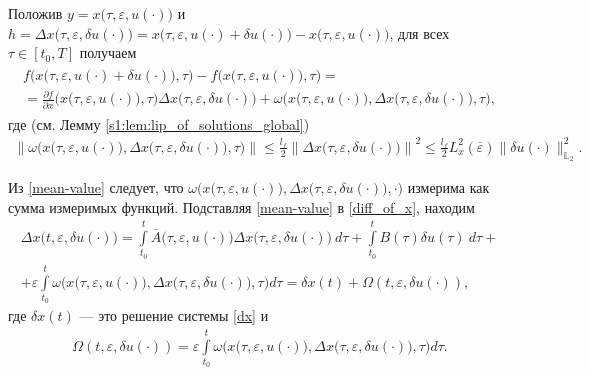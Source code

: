 \documentclass[../main.tex]{subfiles}
\begin{document}
Положив $y = x\big(\tau,\varepsilon, u(\cdot)\big)$ и $h = \Delta x\big(\tau, \varepsilon, \delta u(\cdot)\big) = x\big(\tau,\varepsilon, u(\cdot) + \delta u(\cdot)\big) - x\big(\tau,\varepsilon, u(\cdot)\big)$, для всех $\tau \in [t_0,T]$ получаем
\begin{gather}\label{mean-value}
 \begin{gathered}
 f\Big(x\big(\tau,\varepsilon, u(\cdot) + \delta u(\cdot)\big),\tau\Big) -
 f\Big(x\big(\tau,\varepsilon, u(\cdot)\big),\tau\Big) = \\ = 
 \frac{\partial f}{\partial x} \Big(x\big(\tau,\varepsilon, u(\cdot)\big), \tau\Big) 
 \Delta x\big(\tau, \varepsilon, \delta u(\cdot)\big) + 
 \omega\Big(x\big(\tau,\varepsilon, u(\cdot)\big),\Delta x\big(\tau, \varepsilon, \delta u(\cdot)\big),\tau\Big),
 \end{gathered}
\end{gather}
где (см. Лемму \ref{s1:lem:lip_of_solutions_global})
\begin{gather}\label{omega_est}
 \left\|\omega\Big(x\big(\tau,\varepsilon, u(\cdot)\big),\Delta x\big(\tau, \varepsilon, \delta u(\cdot)\big),\tau\Big)\right\| 
 \leqslant
 \frac{l_f}{2} \left\|\Delta x\big(\tau, \varepsilon, \delta u(\cdot)\big)\right\|^2 
 \leqslant
 \frac{l_f}{2} L_x^2(\overline{\varepsilon}) \|\delta u(\cdot)\|_{\mathbb{L}_2}^2.
\end{gather}

Из \eqref{mean-value} следует, что $\omega\Big(x\big(\tau,\varepsilon, u(\cdot)\big),\Delta x\big(\tau, \varepsilon, \delta u(\cdot)\big),\cdot\big)$ измерима как сумма измеримых функций.
Подставляя \eqref{mean-value} в \eqref{diff_of_x}, находим
\begin{gather*}
 \Delta x\big(t, \varepsilon, \delta u(\cdot)\big)
 = \int\limits_{t_0}^t 
 \overline{A}\big(\tau,\varepsilon,u(\cdot)\big) 
 \Delta x\big(\tau, \varepsilon, \delta u(\cdot)\big)\ d\tau + 
 \int\limits_{t_0}^t B(\tau) \delta u(\tau)\ d\tau + \\ +
 \varepsilon\int\limits_{t_0}^t \omega\Big(x\big(\tau,\varepsilon, u(\cdot)\big),\Delta x\big(\tau, \varepsilon, \delta u(\cdot)\big),\tau\Big) d\tau = 
 \delta x(t) + \Omega(t,\varepsilon, \delta u(\cdot)),
\end{gather*}
где $\delta x(t)$ --- это решение системы \eqref{dx} и
\begin{gather*}
 \Omega(t,\varepsilon, \delta u(\cdot)) = \varepsilon\int\limits_{t_0}^t 
 \omega\Big(x\big(\tau,\varepsilon, u(\cdot)\big),\Delta x\big(\tau, \varepsilon, \delta u(\cdot)\big),\tau\Big) d\tau.
\end{gather*}
\end{document}
